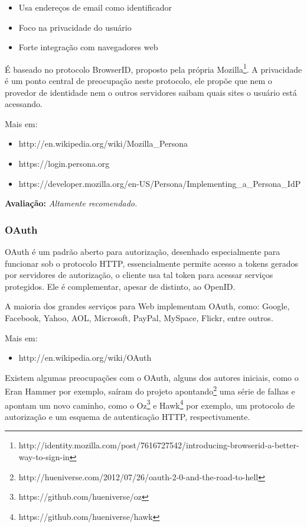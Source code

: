 \documentclass[11pt]{article}
\begin{document}
\begin{itemize}
  \item{Usa endereços de email como identificador}
  \item{Foco na privacidade do usuário}
  \item{Forte integração com navegadores web}
\end{itemize}

É baseado no protocolo BrowserID, proposto pela própria
Mozilla\footnote{http://identity.mozilla.com/post/7616727542/introducing-browserid-a-better-way-to-sign-in}.
A privacidade é um ponto central de preocupação neste protocolo, ele propõe que
nem o provedor de identidade nem o outros servidores saibam quais sites o
usuário está acessando.

Mais em:
\begin{itemize}
  \item{http://en.wikipedia.org/wiki/Mozilla\_Persona}
  \item{https://login.persona.org}
  \item{https://developer.mozilla.org/en-US/Persona/Implementing\_a\_Persona\_IdP}
\end{itemize}

{\bf Avaliação:} {\it Altamente recomendado.}

\subsubsection{OAuth}

OAuth é um padrão aberto para autorização, desenhado especialmente para
funcionar sob o protocolo HTTP, essencialmente permite acesso a tokens gerados
por servidores de autorização, o cliente usa tal token para acessar serviços
protegidos. Ele é complementar, apesar de distinto, ao OpenID.

A maioria dos grandes serviços para Web implementam OAuth, como: Google,
Facebook, Yahoo, AOL, Microsoft, PayPal, MySpace, Flickr, entre outros.

Mais em:
\begin{itemize}
  \item{http://en.wikipedia.org/wiki/OAuth}
\end{itemize}

Existem algumas preocupações com o OAuth, alguns dos autores iniciais, como o
Eran Hammer por exemplo, saíram do projeto
apontando\footnote{http://hueniverse.com/2012/07/26/oauth-2-0-and-the-road-to-hell}
uma série de falhas e apontam um novo caminho, como o
Oz\footnote{https://github.com/hueniverse/oz} e
Hawk\footnote{https://github.com/hueniverse/hawk} por exemplo, um protocolo de
autorização e um esquema de autenticação HTTP, respectivamente.
\end{document}
